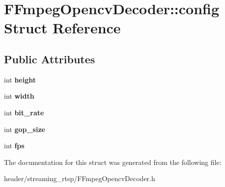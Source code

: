 \hypertarget{struct_f_fmpeg_opencv_decoder_1_1config}{}\section{F\+Fmpeg\+Opencv\+Decoder\+:\+:config Struct Reference}
\label{struct_f_fmpeg_opencv_decoder_1_1config}
\subsection*{Public Attributes}
\begin{DoxyCompactItemize}
\item 
\mbox{\label{struct_f_fmpeg_opencv_decoder_1_1config_a82c380fa2df2949f0cecbe7bc4b79076}} 
int {\bfseries height}
\item 
\mbox{\label{struct_f_fmpeg_opencv_decoder_1_1config_a0230bd2fa59f1c62d25420d8c83a9e82}} 
int {\bfseries width}
\item 
\mbox{\label{struct_f_fmpeg_opencv_decoder_1_1config_a7c92fa819628735fa9a67ae81eaf11c6}} 
int {\bfseries bit\+\_\+rate}
\item 
\mbox{\label{struct_f_fmpeg_opencv_decoder_1_1config_a3a3aa7e845b4c812532ff601617cdda7}} 
int {\bfseries gop\+\_\+size}
\item 
\mbox{\label{struct_f_fmpeg_opencv_decoder_1_1config_acd8aa7a143e0512e58522dc2df9cc7a2}} 
int {\bfseries fps}
\end{DoxyCompactItemize}


The documentation for this struct was generated from the following file\+:\begin{DoxyCompactItemize}
\item 
header/streaming\+\_\+rtsp/F\+Fmpeg\+Opencv\+Decoder.\+h\end{DoxyCompactItemize}
